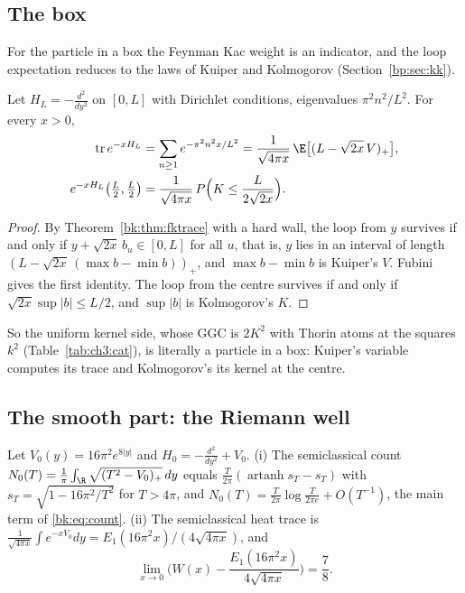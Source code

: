 \subsection{The box}

For the particle in a box the Feynman Kac weight is an indicator, and the loop expectation reduces to the laws of Kuiper and Kolmogorov (Section~\ref{bp:sec:kk}).

\begin{theorem}\label{bk:thm:box}
Let $H_L=-\frac{d^2}{dy^2}$ on $[0,L]$ with Dirichlet conditions, eigenvalues $\pi^2n^2/L^2$. For every $x>0$,
\begin{align*}
\operatorname{tr}e^{-xH_L}&=\sum_{n\ge1}e^{-\pi^2n^2x/L^2}=\frac1{\sqrt{4\pi x}}\,\E\big[(L-\sqrt{2x}\,V)_+\big],\\
e^{-xH_L}\big(\tfrac L2,\tfrac L2\big)&=\frac1{\sqrt{4\pi x}}\,P\Big(K\le\frac L{2\sqrt{2x}}\Big).
\end{align*}
\end{theorem}

\begin{proof}
By Theorem~\ref{bk:thm:fktrace} with a hard wall, the loop from $y$ survives if and only if $y+\sqrt{2x}\,b_u\in[0,L]$ for all $u$, that is, $y$ lies in an interval of length $(L-\sqrt{2x}\,(\max b-\min b))_+$, and $\max b-\min b$ is Kuiper's $V$. Fubini gives the first identity. The loop from the centre survives if and only if $\sqrt{2x}\sup|b|\le L/2$, and $\sup|b|$ is Kolmogorov's $K$.
\end{proof}

So the uniform kernel side, whose GGC is $2K^2$ with Thorin atoms at the squares $k^2$ (Table~\ref{tab:ch3:cat}), is literally a particle in a box: Kuiper's variable computes its trace and Kolmogorov's its kernel at the centre.
\subsection{The smooth part: the Riemann well}

\begin{theorem}\label{bk:thm:well}
Let $V_0(y)=16\pi^2e^{8|y|}$ and $H_0=-\frac{d^2}{dy^2}+V_0$. \textup{(i)} The semiclassical count $N_0(T)=\frac1\pi\int_{\R}\sqrt{(T^2-V_0)_+}\,dy$ equals $\frac T{2\pi}(\operatorname{artanh}s_T-s_T)$ with $s_T=\sqrt{1-16\pi^2/T^2}$ for $T>4\pi$, and $N_0(T)=\frac T{2\pi}\log\frac T{2\pi e}+O(T^{-1})$, the main term of \eqref{bk:eq:count}. \textup{(ii)} The semiclassical heat trace is $\frac1{\sqrt{4\pi x}}\int e^{-xV_0}dy=E_1(16\pi^2x)/(4\sqrt{4\pi x})$, and
\[
\lim_{x\to0}\Big(W(x)-\frac{E_1(16\pi^2x)}{4\sqrt{4\pi x}}\Big)=\frac78 .
\]
\end{theorem}

